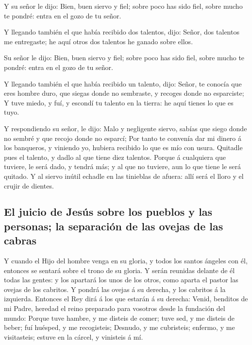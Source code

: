  Y su señor le dijo: Bien, buen siervo y fiel; sobre poco
has sido fiel, sobre mucho te pondré: entra en el gozo de tu señor.

 Y llegando también el que había recibido dos talentos,
dijo: Señor, dos talentos me entregaste; he aquí otros dos talentos he
ganado sobre ellos.

 Su señor le dijo: Bien, buen siervo y fiel; sobre poco has
sido fiel, sobre mucho te pondré: entra en el gozo de tu señor.

 Y llegando también el que había recibido un talento, dijo:
Señor, te conocía que eres hombre duro, que siegas donde no sembraste, y
recoges donde no esparciste;  Y tuve miedo, y fuí, y
escondí tu talento en la tierra: he aquí tienes lo que es tuyo.

 Y respondiendo su señor, le dijo: Malo y negligente
siervo, sabías que siego donde no sembré y que recojo donde no esparcí;
 Por tanto te convenía dar mi dinero á los banqueros, y
viniendo yo, hubiera recibido lo que es mío con usura. 
Quitadle pues el talento, y dadlo al que tiene diez talentos.
 Porque á cualquiera que tuviere, le será dado, y tendrá
más; y al que no tuviere, aun lo que tiene le será quitado.
 Y al siervo inútil echadle en las tinieblas de afuera:
allí será el lloro y el crujir de dientes.

\hypertarget{el-juicio-de-jesuxfas-sobre-los-pueblos-y-las-personas-la-separaciuxf3n-de-las-ovejas-de-las-cabras}{%
\subsection{El juicio de Jesús sobre los pueblos y las personas; la
separación de las ovejas de las
cabras}\label{el-juicio-de-jesuxfas-sobre-los-pueblos-y-las-personas-la-separaciuxf3n-de-las-ovejas-de-las-cabras}}

 Y cuando el Hijo del hombre venga en su gloria, y todos
los santos ángeles con él, entonces se sentará sobre el trono de su
gloria.  Y serán reunidas delante de él todas las gentes: y
los apartará los unos de los otros, como aparta el pastor las ovejas de
los cabritos.  Y pondrá las ovejas á su derecha, y los
cabritos á la izquierda.  Entonces el Rey dirá á los que
estarán á su derecha: Venid, benditos de mi Padre, heredad el reino
preparado para vosotros desde la fundación del mundo: 
Porque tuve hambre, y me disteis de comer; tuve sed, y me disteis de
beber; fuí huésped, y me recogisteis;  Desnudo, y me
cubristeis; enfermo, y me visitasteis; estuve en la cárcel, y vinisteis
á mí.

